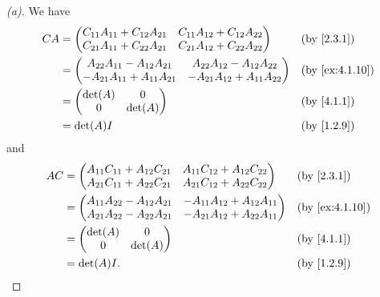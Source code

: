 \begin{proof}[(a)]
	We have
	\begin{align*}
		CA & = \begin{pmatrix}
			       C_{1 1} A_{1 1} + C_{1 2} A_{2 1} & C_{1 1} A_{1 2} + C_{1 2} A_{2 2} \\
			       C_{2 1} A_{1 1} + C_{2 2} A_{2 1} & C_{2 1} A_{1 2} + C_{2 2} A_{2 2}
		       \end{pmatrix}   &  & \by{2.3.1}                    \\
		   & = \begin{pmatrix}
			       A_{2 2} A_{1 1} - A_{1 2} A_{2 1}  & A_{2 2} A_{1 2} - A_{1 2} A_{2 2}  \\
			       -A_{2 1} A_{1 1} + A_{1 1} A_{2 1} & -A_{2 1} A_{1 2} + A_{1 1} A_{2 2}
		       \end{pmatrix} &  & \by{ex:4.1.10}                  \\
		   & = \begin{pmatrix}
			       \det(A) & 0       \\
			       0       & \det(A)
		       \end{pmatrix}                                                       &  & \by{4.1.1}      \\
		   & = \det(A) I                                                                &  & \by{1.2.9}
	\end{align*}
	and
	\begin{align*}
		AC & = \begin{pmatrix}
			       A_{1 1} C_{1 1} + A_{1 2} C_{2 1} & A_{1 1} C_{1 2} + A_{1 2} C_{2 2} \\
			       A_{2 1} C_{1 1} + A_{2 2} C_{2 1} & A_{2 1} C_{1 2} + A_{2 2} C_{2 2}
		       \end{pmatrix}  &  & \by{2.3.1}                   \\
		   & = \begin{pmatrix}
			       A_{1 1} A_{2 2} - A_{1 2} A_{2 1} & -A_{1 1} A_{1 2} + A_{1 2} A_{1 1} \\
			       A_{2 1} A_{2 2} - A_{2 2} A_{2 1} & -A_{2 1} A_{1 2} + A_{2 2} A_{1 1}
		       \end{pmatrix} &  & \by{ex:4.1.10}                  \\
		   & = \begin{pmatrix}
			       \det(A) & 0       \\
			       0       & \det(A)
		       \end{pmatrix}                                                      &  & \by{4.1.1}      \\
		   & = \det(A) I.                                                              &  & \by{1.2.9}
	\end{align*}
\end{proof}

